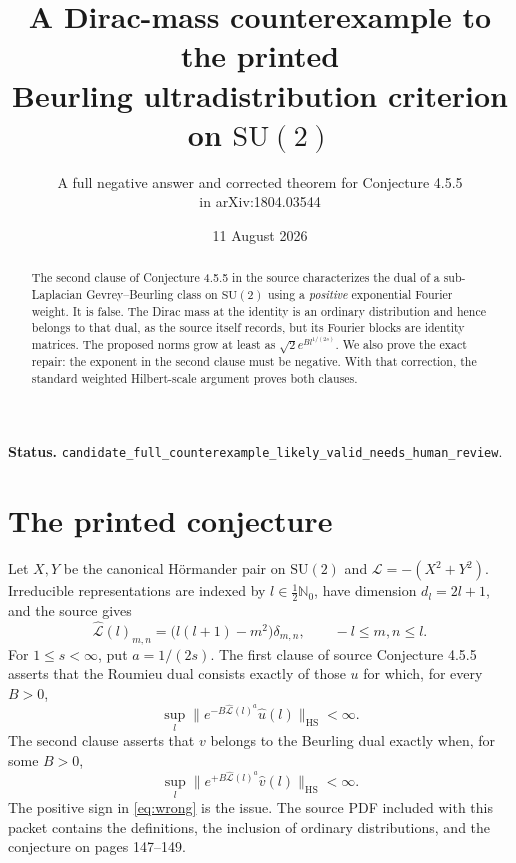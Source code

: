 \documentclass[11pt]{article}
\title{A Dirac-mass counterexample to the printed\\
Beurling ultradistribution criterion on \(\mathrm{SU}(2)\)}
\author{A full negative answer and corrected theorem for Conjecture 4.5.5\\
in arXiv:1804.03544}
\date{11 August 2026}
\newcommand{\SU}{\mathrm{SU}(2)}
\newcommand{\cL}{\mathcal L}
\newcommand{\HS}{\mathrm{HS}}
\newcommand{\N}{\mathbb N}
\begin{document}
\maketitle

\noindent\textbf{Status.}
\texttt{candidate\_full\_counterexample\_likely\_valid\_needs\_human\_review}.

\begin{abstract}
The second clause of Conjecture 4.5.5 in the source characterizes the dual
of a sub-Laplacian Gevrey--Beurling class on \(\SU\) using a \emph{positive}
exponential Fourier weight.  It is false.  The Dirac mass at the identity is
an ordinary distribution and hence belongs to that dual, as the source itself
records, but its Fourier blocks are identity matrices.  The proposed norms
grow at least as \(\sqrt2 e^{B l^{1/(2s)}}\).  We also prove the exact repair:
the exponent in the second clause must be negative.  With that correction,
the standard weighted Hilbert-scale argument proves both clauses.
\end{abstract}

\section{The printed conjecture}

Let \(X,Y\) be the canonical H\"ormander pair on \(\SU\) and
\(\cL=-(X^2+Y^2)\).  Irreducible representations are indexed by
\(l\in\frac12\N_0\), have dimension \(d_l=2l+1\), and the source gives
\begin{equation}\label{eq:symbol}
 \widehat{\cL}(l)_{m,n}
   =\bigl(l(l+1)-m^2\bigr)\delta_{m,n},
 \qquad -l\le m,n\le l.
\end{equation}
For \(1\le s<\infty\), put \(a=1/(2s)\).  The first clause of source
Conjecture 4.5.5 asserts that the Roumieu dual consists exactly of those
\(u\) for which, for every \(B>0\),
\begin{equation}\label{eq:roumieu-source}
 \sup_l\|e^{-B\widehat{\cL}(l)^a}\widehat u(l)\|_{\HS}<\infty.
\end{equation}
The second clause asserts that \(v\) belongs to the Beurling dual exactly
when, for some \(B>0\),
\begin{equation}\label{eq:wrong}
 \sup_l\|e^{+B\widehat{\cL}(l)^a}\widehat v(l)\|_{\HS}<\infty.
\end{equation}
The positive sign in \eqref{eq:wrong} is the issue.  The source PDF included
with this packet contains the definitions, the inclusion of ordinary
distributions, and the conjecture on pages 147--149.
\end{document}
